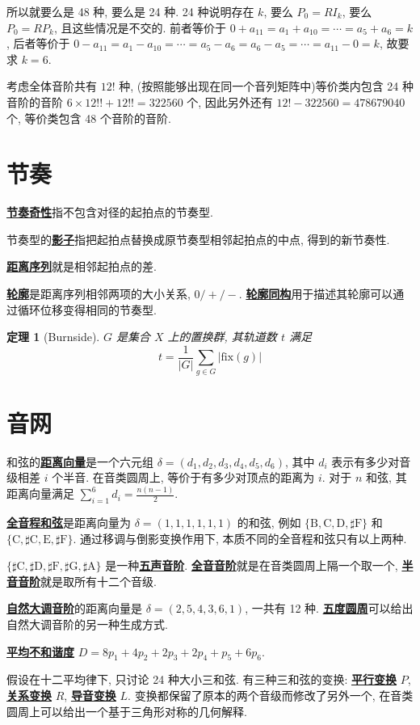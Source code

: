 \documentclass[8pt]{article}
\theoremstyle{compact}
\newtheorem{theorem}{定理}[section]
\def\obj#1{\textbf{\uline{#1}}}
\def\E#1{\mathbb{E}\left[{#1}\right]}
\def\A{\textrm{A}}
\def\B{\textrm{B}}
\def\C{\textrm{C}}
\def\D{\textrm{D}}
\def\E{\textrm{E}}
\def\F{\textrm{F}}
\def\G{\textrm{G}}
\begin{document}
所以就要么是 48 种, 要么是 24 种. 24 种说明存在 $k$, 要么 $P_0 = RI_k$, 要么 $P_0 = RP_k$, 且这些情况是不交的. 前者等价于 $0 + a_{11} = a_1 + a_{10} = \cdots = a_5 + a_6 = k$, 后者等价于 $0 - a_{11} = a_1 - a_{10} = \cdots = a_5 - a_6 = a_6 - a_5 = \cdots = a_{11} - 0 = k$, 故要求 $k = 6$.

考虑全体音阶共有 $12!$ 种, (按照能够出现在同一个音列矩阵中)等价类内包含 24 种音阶的音阶 $6 \times 12!! + 12!! = 322560$ 个, 因此另外还有 $12! - 322560 = 478679040$ 个, 等价类包含 48 个音阶的音阶.


\section{节奏}
\obj{节奏奇性}指不包含对径的起拍点的节奏型.

节奏型的\obj{影子}指把起拍点替换成原节奏型相邻起拍点的中点, 得到的新节奏性.

\obj{距离序列}就是相邻起拍点的差.

\obj{轮廓}是距离序列相邻两项的大小关系, $0 / + / -$. \obj{轮廓同构}用于描述其轮廓可以通过循环位移变得相同的节奏型.

\begin{theorem}[Burnside]
	$G$ 是集合 $X$ 上的置换群, 其轨道数 $t$ 满足 $$t = \frac{1}{|G|}\sum_{g \in G}|\text{fix}(g)|$$
\end{theorem}

\section{音网}
和弦的\obj{距离向量}是一个六元组 $\delta = (d_1, d_2, d_3, d_4, d_5, d_6)$, 其中 $d_i$ 表示有多少对音级相差 $i$ 个半音. 在音类圆周上, 等价于有多少对顶点的距离为 $i$. 对于 $n$ 和弦, 其距离向量满足 $\sum_{i=1}^6 d_i = \frac{n(n-1)}{2}$.

\obj{全音程和弦}是距离向量为 $\delta = (1,1,1,1,1,1)$ 的和弦, 例如 $\{\B, \C, \D, \sharp\F\}$ 和 $\{\C, \sharp\C, \E, \sharp\F\}$. 通过移调与倒影变换作用下, 本质不同的全音程和弦只有以上两种.

$\{\sharp\C, \sharp\D, \sharp\F, \sharp\G, \sharp\A\}$ 是一种\obj{五声音阶}. \obj{全音音阶}就是在音类圆周上隔一个取一个, \obj{半音音阶}就是取所有十二个音级.

\obj{自然大调音阶}的距离向量是 $\delta = (2, 5, 4, 3, 6, 1)$, 一共有 12 种. \obj{五度圆周}可以给出自然大调音阶的另一种生成方式.

\obj{平均不和谐度} $D = 8p_1 + 4p_2 + 2p_3 + 2p_4 + p_5 + 6p_6$.

假设在十二平均律下, 只讨论 24 种大小三和弦. 有三种三和弦的变换: \obj{平行变换} $P$, \obj{关系变换} $R$, \obj{导音变换} $L$. 变换都保留了原本的两个音级而修改了另外一个, 在音类圆周上可以给出一个基于三角形对称的几何解释.
\end{document}
